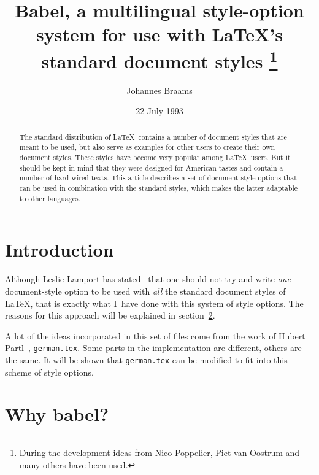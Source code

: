 \documentclass{ltugboat}
\newcommand{\file}[1]{\texttt{#1}}
\newcommand{\babel}{\textsf{babel}}
\begin{document}
\title {Babel, a multilingual style-option system for use
        with \LaTeX's standard document styles%
       \thanks{During the development ideas from Nico Poppelier,
               Piet van Oostrum and many others have been used.}
       }

\author{Johannes Braams}
\address{PTT Research Neher Laboratories\\
         P.O. Box 421\\
         2260 AK Leidschendam}

\date{22 July 1993}

\maketitle

\begin{abstract}
  The standard distribution of \LaTeX\ contains a number of document
  styles that are meant to be used, but also serve as examples for
  other users to create their own document styles.  These styles have
  become very popular among \LaTeX\ users.  But it should be kept in
  mind that they were designed for American tastes and contain a
  number of hard-wired texts. This article describes a set of
  document-style options that can be used in combination with the
  standard styles, which makes the latter adaptable to other
  languages.
\end{abstract}

\section{Introduction}

Although Leslie Lamport has stated~\cite{LLth} that one should not try
and write \emph{one} document-style option to be used with \emph{all}
the standard document styles of \LaTeX, that is exactly what I~have
done with this system of style options. The reasons for this approach
will be explained in section~\ref{why}.

A lot of the ideas incorporated in this set of files come from the
work of Hubert Partl~\cite{HP}, \file{german.tex}. Some parts in the
implementation are different, others are the same. It will be shown
that \file{german.tex} can be modified to fit into this scheme of
style options.

\section{Why \babel?}\label{why}
\end{document}
